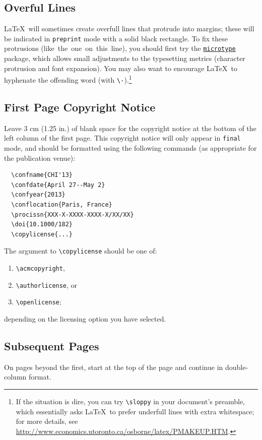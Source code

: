 \documentclass[preprint]{../latex/sigchi-modern}
\begin{document}
\subsection{Overful Lines}
\LaTeX\ will sometimes create overfull lines that protrude into margins; these
will be indicated in \texttt{preprint} mode with a solid black rectangle. To fix
these protrusions (like~the~one~on~this~line), you should first try the
\href{http://ctan.org/pkg/microtype}{\texttt{microtype}} package, which allows
small adjustments to the typesetting metrics (character protrusion and font
expansion). You may also want to encourage \LaTeX\ to hyphenate the offending
word (with \texttt{\textbackslash -}).\footnote{If the situation is dire, you 
can try \texttt{\textbackslash sloppy} in your document's preamble, which
essentially asks \LaTeX\ to prefer underfull lines with extra whitespace; for
more details, see
\url{http://www.economics.utoronto.ca/osborne/latex/PMAKEUP.HTM}.}

\subsection{First Page Copyright Notice}
Leave 3 cm (1.25 in.) of blank space for the copyright notice at the bottom of
the left column of the first page. This copyright notice will only appear in
\texttt{final} mode, and should be formatted using the following commands (as
appropriate for the publication venue):
\begin{verbatim}
  \confname{CHI'13}
  \confdate{April 27--May 2}
  \confyear{2013}
  \conflocation{Paris, France}
  \procissn{XXX-X-XXXX-XXXX-X/XX/XX}
  \doi{10.1000/182}
  \copylicense{...}
\end{verbatim}

The argument to \texttt{\textbackslash copylicense} should be one of:
\begin{enumerate}
  \item\texttt{\textbackslash acmcopyright}, 
  \item\texttt{\textbackslash authorlicense}, or 
  \item\texttt{\textbackslash openlicense}; 
\end{enumerate}
depending on the licensing option you have selected.

\subsection{Subsequent Pages}
On pages beyond the first, start at the top of the page and continue in
double-column format.
\end{document}
